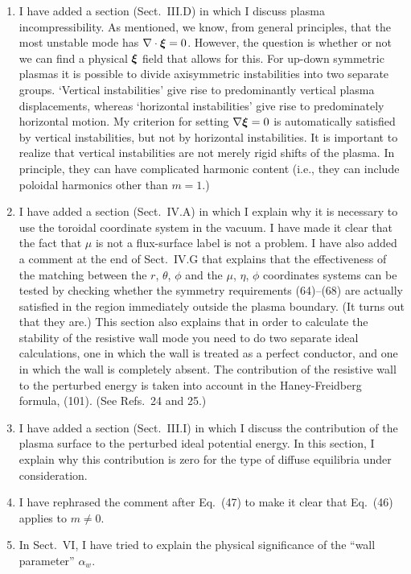 \documentclass{article}[12pt]
\newcommand {\bxi}{\mbox{\boldmath$\xi$}}
\begin{document}
\begin{enumerate}
\item I have added a section (Sect.~III.D) in which I discuss plasma incompressibility. As mentioned, we know, from general
principles, that the most unstable mode has $\nabla\cdot\bxi=0$. However, the question is whether or not we can find a physical
$\bxi$ field that allows for this. For up-down symmetric plasmas it is possible to divide axisymmetric instabilities into two
separate groups. `Vertical instabilities' give rise to predominantly vertical plasma displacements, whereas `horizontal instabilities' 
give rise to predominately horizontal motion. My criterion for setting $\nabla\bxi=0$ is automatically satisfied by vertical
instabilities, but not by horizontal instabilities. It is important to realize that vertical instabilities are not merely rigid shifts of the plasma.
In principle, they can have complicated harmonic content (i.e., they can include poloidal harmonics other than $m=1$.)

\item I have added a section (Sect.~IV.A) in which I explain why it is necessary to use the toroidal coordinate system in the vacuum.
I have made it clear that the fact that $\mu$ is not a flux-surface label is not a  problem. 
I have also added a comment at the end of Sect.~IV.G that explains that the effectiveness of the matching between the
$r$, $\theta$, $\phi$ and the $\mu$, $\eta$, $\phi$ coordinates systems can be tested by checking whether the symmetry
requirements (64)--(68) are actually satisfied in the region immediately outside the plasma boundary. (It turns out that they are.)
This section also explains that in order to calculate the stability of the resistive wall mode you need to do two separate ideal
calculations, one in which the wall is treated as a perfect conductor, and one in which the wall is completely absent. The
contribution of the resistive wall to the perturbed energy is taken into account in the Haney-Freidberg formula, (101). (See Refs.~24 and 25.)

\item I have added a section (Sect.~III.I) in which I discuss the contribution of the plasma surface to the perturbed ideal
potential energy. In this section, I explain why this contribution is zero for the type of diffuse equilibria under consideration. 

\item I have rephrased the comment after Eq.~(47) to make it clear that Eq.~(46) applies to $m\neq 0$.

\item In Sect.~VI, I have tried to explain the physical significance of the ``wall parameter'' $\alpha_w$. 


\end{enumerate}
\end{document}
